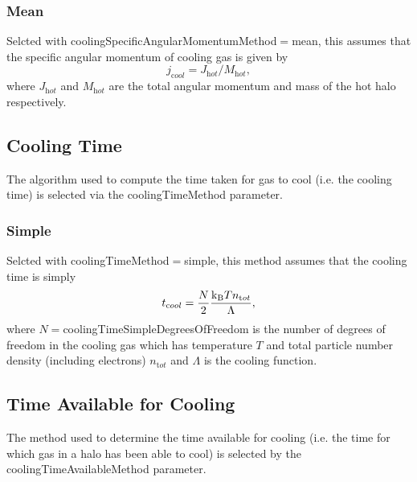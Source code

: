 \subsubsection{Mean}

Selcted with {\normalfont \ttfamily coolingSpecificAngularMomentumMethod}$=${\normalfont \ttfamily mean}, this assumes that the specific angular momentum of cooling gas is given by
\begin{equation}
 j_{\mathrm cool} = J_{\mathrm hot}/M_{\mathrm hot},
\end{equation}
where $J_{\mathrm hot}$ and $M_{\mathrm hot}$ are the total angular momentum and mass of the hot halo respectively.

\subsection{Cooling Time}\label{sec:CoolingTime}

The algorithm used to compute the time taken for gas to cool (i.e. the cooling time) is selected via the {\normalfont \ttfamily coolingTimeMethod} parameter.

\subsubsection{Simple}

Selcted with {\normalfont \ttfamily coolingTimeMethod}$=${\normalfont \ttfamily simple}, this method assumes that the cooling time is simply
\begin{equation}
 t_{\mathrm cool} = {N \over 2} {{\mathrm k}_{\mathrm B} T n_{\mathrm tot} \over \Lambda},
\end{equation}
where $N=${\normalfont \ttfamily coolingTimeSimpleDegreesOfFreedom} is the number of degrees of freedom in the cooling gas which has temperature $T$ and total particle number density (including electrons) $n_{\mathrm tot}$ and $\Lambda$ is the cooling function.

\subsection{Time Available for Cooling}\label{sec:TimeAvailableCooling}

The method used to determine the time available for cooling (i.e. the time for which gas in a halo has been able to cool) is selected by the {\normalfont \ttfamily coolingTimeAvailableMethod} parameter.

